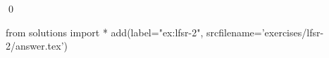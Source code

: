 
\begin{ex} 
  \label{ex:lfsr-2}
  
  \qed
\end{ex} 
\begin{python0}
from solutions import *
add(label="ex:lfsr-2",
    srcfilename='exercises/lfsr-2/answer.tex') 
\end{python0}
